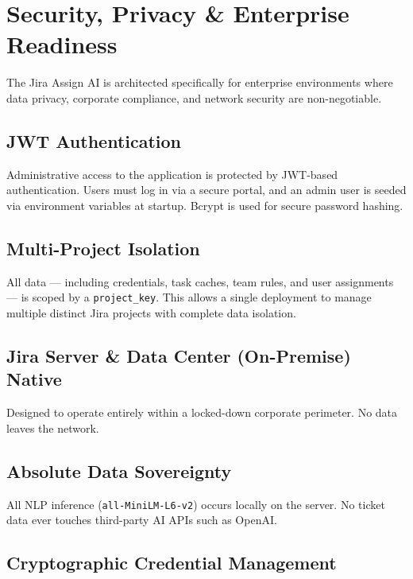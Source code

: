 \documentclass[12pt, a4paper]{article}
\begin{document}
\section{Security, Privacy \& Enterprise Readiness}

The Jira Assign AI is architected specifically for enterprise environments where data privacy, corporate compliance, and network security are non-negotiable.

\subsection{JWT Authentication}

Administrative access to the application is protected by JWT-based authentication. Users must log in via a secure portal, and an admin user is seeded via environment variables at startup. Bcrypt is used for secure password hashing.

\subsection{Multi-Project Isolation}

All data — including credentials, task caches, team rules, and user assignments — is scoped by a \texttt{project\_key}. This allows a single deployment to manage multiple distinct Jira projects with complete data isolation.

\subsection{Jira Server \& Data Center (On-Premise) Native}

Designed to operate entirely within a locked-down corporate perimeter. No data leaves the network.

\subsection{Absolute Data Sovereignty}

All NLP inference (\texttt{all-MiniLM-L6-v2}) occurs locally on the server. No ticket data ever touches third-party AI APIs such as OpenAI.

\subsection{Cryptographic Credential Management}
\end{document}
